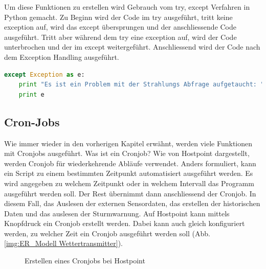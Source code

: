 Um diese Funktionen zu erstellen wird Gebrauch vom try, except Verfahren in Python gemacht. Zu Beginn wird der Code im try ausgeführt, tritt keine exception auf, wird das except übersprungen und der anschliessende Code ausgeführt. Tritt aber während dem try eine exception auf, wird der Code unterbrochen und der im except weitergeführt. Anschliessend wird der Code nach dem Exception Handling ausgeführt.\cite{ThePythonTutorial8.ErrorsAndExceptions:Python}

\begin{lstlisting}[label=lst:printfunction,caption=Beispiel für print Funktion, language=Python, style=py]
except Exception as e:
    print "Es ist ein Problem mit der Strahlungs Abfrage aufgetaucht: "
    print e
\end{lstlisting}

\subsection{Cron-Jobs}
Wie immer wieder in den vorherigen Kapitel erwähnt, werden viele Funktionen mit Cronjobs ausgeführt. Was ist ein Cronjob? Wie von Hostpoint \cite{Hostpoint:CronjobsEinrichten} dargestellt, werden Cronjob für wiederkehrende Abläufe verwendet. Anders formuliert, kann ein Script zu einem bestimmten Zeitpunkt automatisiert ausgeführt werden. Es wird angegeben zu welchem Zeitpunkt oder in welchem Intervall das Programm ausgeführt werden soll. Der Rest übernimmt dann anschliessend der Cronjob. In diesem Fall, das Auslesen der externen Sensordaten, das erstellen der historischen Daten und das auslesen der Sturmwarnung. Auf Hostpoint kann mittels Knopfdruck ein Cronjob erstellt werden. Dabei kann auch gleich konfiguriert werden, zu welcher Zeit ein Cronjob ausgeführt werden soll (Abb. \ref{img:ER_Modell Wettertransmitter}).

\begin{figure}[h!]
	\centering
	\caption{Erstellen eines Cronjobs bei Hostpoint}
	\label{img:Cronjob}
\end{figure}

